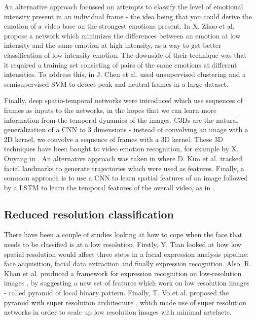\documentclass[sigconf]{acmart}
\begin{document}
{An alternative approach focussed on attempts to classify the level of
emotional intensity present in an individual frame - the idea being that you
could derive the emotion of a video base on the strongest emotions present. 
In \cite{zhao2016peak} X. Zhao et al. propose a network which minimizes the differences
between an emotion at low intensity and the same emotion at high intensity, as
a way to get better classification of low intensity emotion. The downside of
their technique was that it required a training set consisting of pairs of the
same emotions at different intensities. To address this, 
in \cite{chen2018deep} J. Chen et al. used unsupervised clustering and a semisupervised 
SVM to detect peak and neutral frames in a large dataset.

Finally, deep spatio-temporal networks were introduced which use sequences of
frames as inputs to the networks, in the hopes that we can learn more
information from the temporal dynamics of the images. C3Ds
\cite{tran2015learning} are the natural generalization of a CNN to 3
dimensions - instead of convolving an image with a 2D kernel, we convolve a
sequence of frames with a 3D kernel. These 3D techniques have been bought to
video emotion recognition, for example by X. Ouyang in \cite{ouyang2017audio}.
An alternative approach was taken in \cite{kim2017multi} where D. Kim et al.
tracked facial landmarks to generate trajectories which were used as features.
Finally, a common approach is to use a CNN to learn spatial features of an
image followed by a LSTM to learn the temporal features of the overall video, as in
\cite{kim2017multiobjective}.

\subsection{Reduced resolution classification}

There have been a couple of studies looking at how to cope when the face that
needs to be classified is at a low resolution. Firstly, Y. Tian
\cite{tian2004evaluation} looked at how low spatial resolution would affect
three steps in a facial expression analysis pipeline: face acquisition,
facial data extraction and finally expression recognition. Also, R. Khan et
al. produced a framework for expression recognition on low-resolution images
\cite{khan2013framework}, by suggesting a new set of features which work on
low resolution images - called pyramid of local binary pattern. Finally, T.
Vo et al. proposed the pyramid with super resolution architecture
\cite{vo2020pyramid}, which made use of super resolution networks in order to
scale up low resolution images with minimal artefacts. 



}
\end{document}
